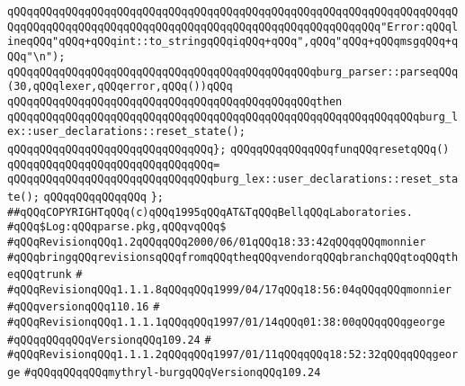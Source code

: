 \verb|qQQqqQQqqQQqqQQqqQQqqQQqqQQqqQQqqQQqqQQqqQQqqQQqqQQqqQQqqQQqqQQqqQQqqQQqqQQqqQQqqQQqqQQqqQQqqQQqqQQqqQQqqQQqqQQqqQQqqQQqqQQqqQQq"Error:qQQqlineqQQq"qQQq+qQQqint::to_stringqQQqiqQQq+qQQq",qQQq"qQQq+qQQqmsgqQQq+qQQq"\n");|\newline
\newline
\verb|qQQqqQQqqQQqqQQqqQQqqQQqqQQqqQQqqQQqqQQqqQQqqQQqburg_parser::parseqQQq(30,qQQqlexer,qQQqerror,qQQq())qQQq|\newline
\verb|qQQqqQQqqQQqqQQqqQQqqQQqqQQqqQQqqQQqqQQqqQQqqQQqthen|\newline
\verb|qQQqqQQqqQQqqQQqqQQqqQQqqQQqqQQqqQQqqQQqqQQqqQQqqQQqqQQqqQQqqQQqburg_lex::user_declarations::reset_state();|\newline
\verb|qQQqqQQqqQQqqQQqqQQqqQQqqQQqqQQq};|\newline
\newline
\verb|qQQqqQQqqQQqqQQqfunqQQqresetqQQq()|\newline
\verb|qQQqqQQqqQQqqQQqqQQqqQQqqQQqqQQq=|\newline
\verb|qQQqqQQqqQQqqQQqqQQqqQQqqQQqqQQqburg_lex::user_declarations::reset_state();|\newline
\verb|qQQqqQQqqQQqqQQq|\newline
\verb|};|\newline
\newline
\verb|##qQQqCOPYRIGHTqQQq(c)qQQq1995qQQqAT&TqQQqBellqQQqLaboratories.|\newline
\verb|#qQQq$Log:qQQqparse.pkg,qQQqvqQQq$|\newline
\verb|#qQQqRevisionqQQq1.2qQQqqQQq2000/06/01qQQq18:33:42qQQqqQQqmonnier|\newline
\verb|#qQQqbringqQQqrevisionsqQQqfromqQQqtheqQQqvendorqQQqbranchqQQqtoqQQqtheqQQqtrunk|\newline
\verb|#|\newline
\verb|#qQQqRevisionqQQq1.1.1.8qQQqqQQq1999/04/17qQQq18:56:04qQQqqQQqmonnier|\newline
\verb|#qQQqversionqQQq110.16|\newline
\verb|#|\newline
\verb|#qQQqRevisionqQQq1.1.1.1qQQqqQQq1997/01/14qQQq01:38:00qQQqqQQqgeorge|\newline
\verb|#qQQqqQQqqQQqVersionqQQq109.24|\newline
\verb|#|\newline
\verb|#qQQqRevisionqQQq1.1.1.2qQQqqQQq1997/01/11qQQqqQQq18:52:32qQQqqQQqgeorge|\newline
\verb|#qQQqqQQqqQQqmythryl-burgqQQqVersionqQQq109.24|\newline
